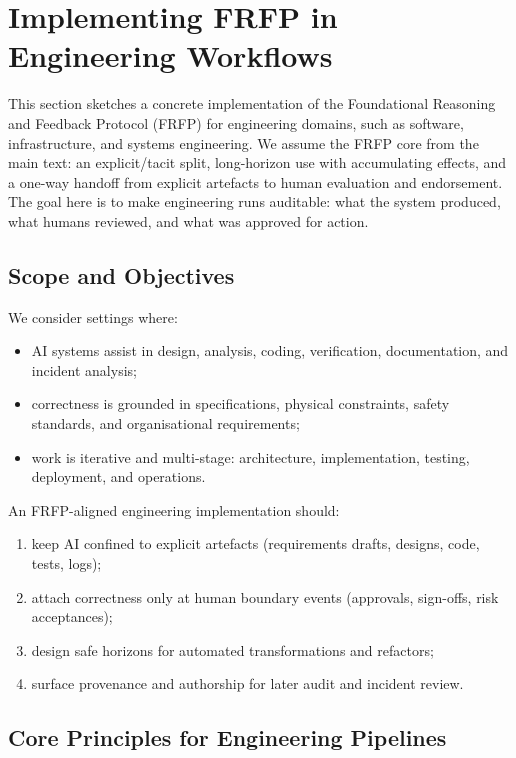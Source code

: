 \section{Implementing FRFP in Engineering Workflows}
\label{sec:frfp-engineering}

This section sketches a concrete implementation of the Foundational Reasoning
and Feedback Protocol (FRFP) for engineering domains, such as software,
infrastructure, and systems engineering.
We assume the FRFP core from the main text: an explicit/tacit split, long-horizon use with accumulating
effects, and a one-way handoff from explicit artefacts to human evaluation and endorsement. The goal here
is to make engineering runs auditable: what the system produced, what humans reviewed, and what was approved for action.

\subsection{Scope and Objectives}

We consider settings where:

\begin{itemize}
  \item AI systems assist in design, analysis, coding, verification,
        documentation, and incident analysis;
  \item correctness is grounded in specifications, physical constraints,
        safety standards, and organisational requirements;
  \item work is iterative and multi-stage: architecture, implementation,
        testing, deployment, and operations.
\end{itemize}

An FRFP-aligned engineering implementation should:

\begin{enumerate}
  \item keep AI confined to explicit artefacts (requirements drafts, designs,
        code, tests, logs);
  \item attach correctness only at human boundary events
        (approvals, sign-offs, risk acceptances);
  \item design safe horizons for automated transformations and refactors;
  \item surface provenance and authorship for later audit and incident review.
\end{enumerate}

\subsection{Core Principles for Engineering Pipelines}

